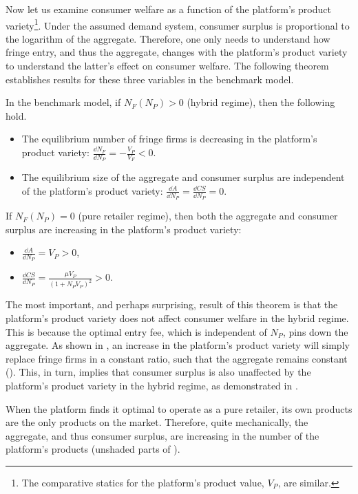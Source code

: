 Now let us examine consumer welfare as a function of the platform's product variety\footnote{
    The comparative statics for the platform's product value, $V_P$, are similar.
}.
Under the assumed demand system, consumer surplus is proportional to the logarithm of the aggregate.
Therefore, one only needs to understand how fringe entry, and thus the aggregate, changes with the platform's product variety to understand the latter's effect on consumer welfare.
The following theorem establishes results for these three variables in the benchmark model.
\begin{theorem}
    \label{prop:equilibrium_benchmark}
    In the benchmark model, if $N_F(N_P) > 0$ (hybrid regime), then the following hold.
    \begin{itemize}
        \item The equilibrium number of fringe firms is decreasing in the platform's product variety: $\frac{\dd N_F}{\dd N_P} = -\frac{V_P}{V_F} < 0$.
        \item The equilibrium size of the aggregate and consumer surplus are independent of the platform's product variety: $\frac{\dd A}{\dd N_P} = \frac{\dd CS}{\dd N_P} = 0$.
    \end{itemize}
    If $N_F(N_P) = 0$ (pure retailer regime), then both the aggregate and consumer surplus are increasing in the platform's product variety:
    \begin{itemize}
        \item $\frac{\dd A}{\dd N_P} = V_P > 0$,
        \item $\frac{\dd CS}{\dd N_P} = \frac{\mu V_P}{(1 + N_P V_P)^2} > 0$.
    \end{itemize}
\end{theorem}

The most important, and perhaps surprising, result of this theorem is that the platform's product variety does not affect consumer welfare in the hybrid regime.
This is because the optimal entry fee, which is independent of $N_P$, pins down the aggregate.
As shown in , an increase in the platform's product variety will simply replace fringe firms in a constant ratio, such that the aggregate remains constant ().
This, in turn, implies that consumer surplus is also unaffected by the platform's product variety in the hybrid regime, as demonstrated in .

When the platform finds it optimal to operate as a pure retailer, its own products are the only products on the market.
Therefore, quite mechanically, the aggregate, and thus consumer surplus, are increasing in the number of the platform's products (unshaded parts of ).

